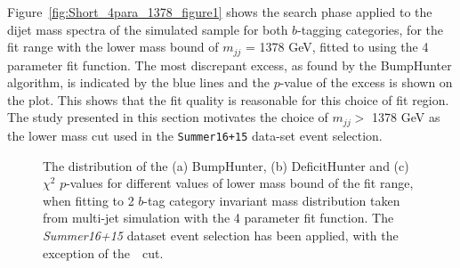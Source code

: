 Figure~\ref{fig:Short_4para_1378_figure1} shows the search phase applied to the dijet mass spectra
of the simulated sample for both $b$-tagging categories,
for the fit range with the lower mass bound of $m_{jj}$ = 1378 GeV,
fitted to using the 4 parameter fit function.
The most discrepant excess, as found by the BumpHunter algorithm, is indicated by the blue lines
and the $p$-value of the excess is shown on the plot.
This shows that the fit quality is reasonable for this choice of fit region.
The study presented in this section motivates the choice of $m_{jj} >$ 1378 GeV
as the lower mass cut used in the \verb|Summer16+15| data-set event selection.

\begin{figure}[!htb]
  \begin{center}
    \captionsetup[subfigure]{aboveskip=0pt,justification=centering}
  \end{center}
  \caption{The distribution of the (a) BumpHunter, (b) DeficitHunter and (c) $\chi^{2}$ $p$-values
    for different values of lower mass bound of the fit range, when fitting to 2 $b$-tag category
    invariant mass distribution taken from multi-jet simulation with the 4 parameter fit function.
    The \textit{Summer16+15} dataset event selection has been applied, with the exception of the~\mjj~cut.}
  \label{fig:mjjGraphs_bb}
\end{figure}

